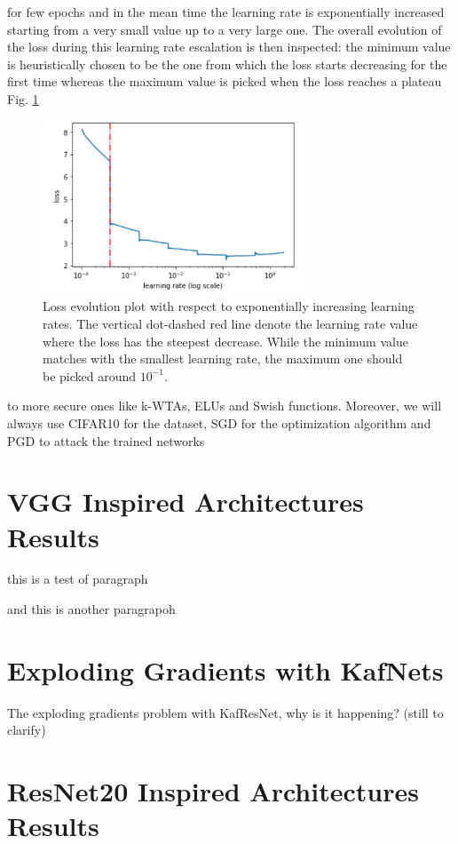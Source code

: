 \documentclass[LaM,binding=0.6cm]{./packages/sapthesis/sapthesis}
\begin{document}
for few epochs and in the mean time the learning rate is exponentially increased starting from a 
very small value up to a very large one. The overall evolution of the loss 
during this learning rate escalation is then inspected: the minimum value is 
heuristically chosen to be the one from which the loss starts decreasing for the first time 
whereas the maximum value is picked when the loss reaches a plateau Fig. \ref{fig:lrf}
\begin{figure}[h!]
    \centering
    \includegraphics[width=0.7\textwidth]{lrf}
    \caption{Loss evolution plot with respect to exponentially increasing learning rates. The 
    vertical dot-dashed red line denote the learning rate value where the loss has the steepest decrease.
    While the minimum value matches with the smallest learning rate, the maximum one should be picked around
    $10^{-1}$.}
    \label{fig:lrf}
\end{figure}





to more secure ones like k-WTAs, ELUs and Swish functions. Moreover, we will always use CIFAR10 for the dataset,
SGD for the optimization algorithm and PGD to attack the trained networks
    \section{VGG Inspired Architectures Results}
this is a test of paragraph \par
and this is another paragrapoh
    \section{Exploding Gradients with KafNets}

        The exploding gradients problem with KafResNet, why is it happening? (still to clarify)

    \section{ResNet20 Inspired Architectures Results}
\end{document}
